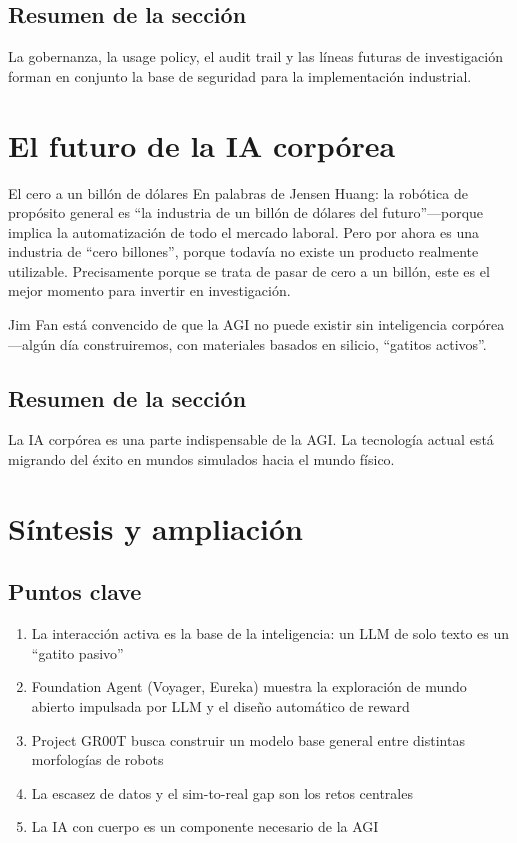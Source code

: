 \documentclass[a4paper]{article}
\begin{document}
\subsection{Resumen de la sección}

La gobernanza, la usage policy, el audit trail y las líneas futuras de investigación forman en conjunto la base de seguridad para la implementación industrial.

\section{El futuro de la IA corpórea}

\begin{importantbox}{El cero a un billón de dólares}
En palabras de Jensen Huang: la robótica de propósito general es ``la industria de un billón de dólares del futuro''—porque implica la automatización de todo el mercado laboral. Pero por ahora es una industria de ``cero billones'', porque todavía no existe un producto realmente utilizable. Precisamente porque se trata de pasar de cero a un billón, este es el mejor momento para invertir en investigación.
\end{importantbox}

Jim Fan está convencido de que la AGI no puede existir sin inteligencia corpórea—algún día construiremos, con materiales basados en silicio, ``gatitos activos''.

\subsection{Resumen de la sección}

La IA corpórea es una parte indispensable de la AGI. La tecnología actual está migrando del éxito en mundos simulados hacia el mundo físico.

\section{Síntesis y ampliación}

\subsection{Puntos clave}

\begin{enumerate}
    \item La interacción activa es la base de la inteligencia: un LLM de solo texto es un ``gatito pasivo''
    \item Foundation Agent (Voyager, Eureka) muestra la exploración de mundo abierto impulsada por LLM y el diseño automático de reward
    \item Project GR00T busca construir un modelo base general entre distintas morfologías de robots
    \item La escasez de datos y el sim-to-real gap son los retos centrales
    \item La IA con cuerpo es un componente necesario de la AGI
\end{enumerate}
\end{document}
